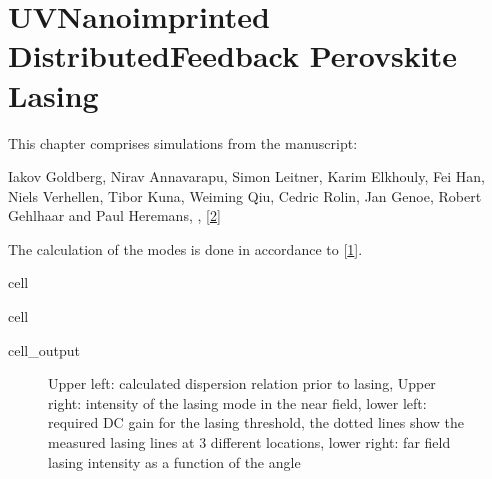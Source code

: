 \documentclass[a4paper,10pt,english,openany,oneside]{jupyterBook}
\begin{document}
\chapter{UV\sphinxhyphen{}Nanoimprinted Distributed\sphinxhyphen{}Feedback Perovskite Lasing}
\label{\detokenize{NanoimprintedDFB:uv-nanoimprinted-distributed-feedback-perovskite-lasing}}\label{\detokenize{NanoimprintedDFB::doc}}
\sphinxAtStartPar
This chapter comprises simulations from the manuscript:

\sphinxAtStartPar
Iakov Goldberg, Nirav Annavarapu, Simon Leitner, Karim Elkhouly, Fei Han, Niels Verhellen, Tibor Kuna, Weiming Qiu, Cedric Rolin, Jan Genoe, Robert Gehlhaar and Paul Heremans, , {[}\hyperlink{cite.bib:id4}{2}{]}

\sphinxAtStartPar
The calculation of the modes is done in accordance to {[}\hyperlink{cite.bib:id3}{1}{]}.

\begin{sphinxuseclass}{cell}
\end{sphinxuseclass}
\begin{sphinxuseclass}{cell}\begin{sphinxVerbatimOutput}

\begin{sphinxuseclass}{cell_output}
\begin{figure}[htbp]
\centering
\capstart

\noindent{}
\caption{Upper left: calculated dispersion relation prior to lasing, Upper right: intensity of the lasing mode in the near field, lower left: required DC gain for the lasing threshold, the dotted lines show the measured lasing lines at 3 different locations, lower right: far field lasing intensity as a function of the angle}\label{\detokenize{NanoimprintedDFB:iakov1}}\end{figure}

\end{sphinxuseclass}\end{sphinxVerbatimOutput}

\end{sphinxuseclass}
\sphinxstepscope
\end{document}
